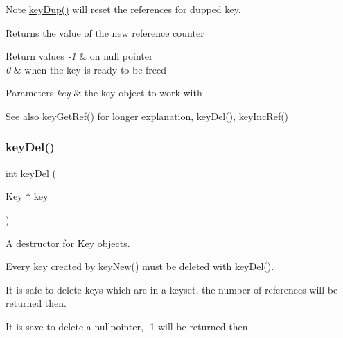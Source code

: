 \begin{DoxyNote}{Note}
\hyperlink{group__key_gae6ec6a60cc4b8c1463fa08623d056ce3}{key\+Dup()} will reset the references for dupped key.
\end{DoxyNote}
\begin{DoxyReturn}{Returns}
the value of the new reference counter 
\end{DoxyReturn}

\begin{DoxyRetVals}{Return values}
{\em -\/1} & on null pointer \\
\hline
{\em 0} & when the key is ready to be freed \\
\hline
\end{DoxyRetVals}

\begin{DoxyParams}{Parameters}
{\em key} & the key object to work with \\
\hline
\end{DoxyParams}
\begin{DoxySeeAlso}{See also}
\hyperlink{group__key_ga4aabc4272506dd63161db2bbb42de8ae}{key\+Get\+Ref()} for longer explanation, \hyperlink{group__key_ga3df95bbc2494e3e6703ece5639be5bb1}{key\+Del()}, \hyperlink{group__key_ga6970a6f254d67af7e39f8e469bb162f1}{key\+Inc\+Ref()} 
\end{DoxySeeAlso}
\mbox{\label{group__key_ga3df95bbc2494e3e6703ece5639be5bb1}} 
\subsubsection{\texorpdfstring{key\+Del()}{keyDel()}}
{\footnotesize\ttfamily int key\+Del (\begin{DoxyParamCaption}\item[{Key $\ast$}]{key }\end{DoxyParamCaption})}



A destructor for Key objects. 

Every key created by \hyperlink{group__key_gad23c65b44bf48d773759e1f9a4d43b89}{key\+New()} must be deleted with \hyperlink{group__key_ga3df95bbc2494e3e6703ece5639be5bb1}{key\+Del()}.

It is safe to delete keys which are in a keyset, the number of references will be returned then.

It is save to delete a nullpointer, -\/1 will be returned then.

